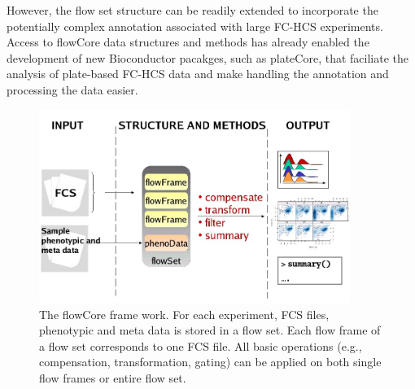 \documentclass[12pt]{article}
\begin{document}
However, the flow set structure can be readily extended to incorporate the
potentially complex annotation associated with large FC-HCS experiments. Access
to flowCore data structures and methods has already enabled the development of
new Bioconductor pacakges, such as plateCore, that faciliate the analysis of
plate-based FC-HCS data and make handling the annotation and processing
the data easier.


\begin{figure}
\centering
\includegraphics[width=0.9\textwidth]{Figure1-flowCoreFrameWork.jpg}
\caption{\label{fig1:FrameWork}{The flowCore frame work. For each
    experiment, FCS files, phenotypic and meta data is stored in a
    flow set. Each flow frame of a flow set corresponds to one FCS
    file. All basic operations (e.g., compensation, transformation,
    gating) can be applied on both single flow frames or entire flow
    set.}}
\end{figure}
\end{document}
